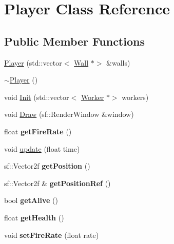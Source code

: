 \hypertarget{class_player}{}\section{Player Class Reference}
\label{class_player}
\subsection*{Public Member Functions}
\begin{DoxyCompactItemize}
\item 
\mbox{\hyperlink{class_player_aa6ba3005051279dc1d45ac615f197ef5}{Player}} (std\+::vector$<$ \mbox{\hyperlink{class_wall}{Wall}} $\ast$$>$ \&walls)
\item 
\mbox{\hyperlink{class_player_a749d2c00e1fe0f5c2746f7505a58c062}{$\sim$\+Player}} ()
\item 
void \mbox{\hyperlink{class_player_adc476f05d1e17ce5f8aaa8a60432b3d4}{Init}} (std\+::vector$<$ \mbox{\hyperlink{class_worker}{Worker}} $\ast$$>$ workers)
\item 
void \mbox{\hyperlink{class_player_a6a0b48c845f9c341283b5fc5a7898f9b}{Draw}} (sf\+::\+Render\+Window \&window)
\item 
\mbox{\label{class_player_ac81962f3fcd0c78c2da40e0bfec9466f}} 
float {\bfseries get\+Fire\+Rate} ()
\item 
void \mbox{\hyperlink{class_player_a194b7082791d882887071d8d2893c5e4}{update}} (float time)
\item 
\mbox{\label{class_player_a23356f99a9de86d3d47eadb679b332dc}} 
sf\+::\+Vector2f {\bfseries get\+Position} ()
\item 
\mbox{\label{class_player_a34f7a992b128e39efd89821a9269b309}} 
sf\+::\+Vector2f \& {\bfseries get\+Position\+Ref} ()
\item 
\mbox{\label{class_player_aa45f751e7ba8afcd9894d57ef4813d50}} 
bool {\bfseries get\+Alive} ()
\item 
\mbox{\label{class_player_a2d1542816021d46bf0d007d57a2c7291}} 
float {\bfseries get\+Health} ()
\item 
\mbox{\label{class_player_a65235f2e8ad1d16ba5826cd21c16aeb5}} 
void {\bfseries set\+Fire\+Rate} (float rate)

\end{DoxyCompactItemize}
